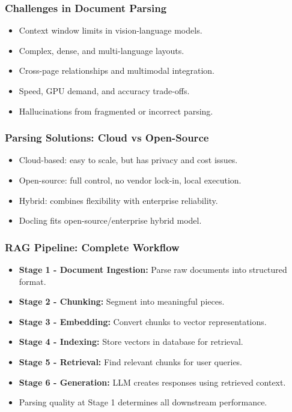 \begin{frame}[fragile]\frametitle{Challenges in Document Parsing}
      \begin{itemize}
        \item Context window limits in vision-language models.
        \item Complex, dense, and multi-language layouts.
        \item Cross-page relationships and multimodal integration.
        \item Speed, GPU demand, and accuracy trade-offs.
        \item Hallucinations from fragmented or incorrect parsing.
      \end{itemize}
\end{frame}

\begin{frame}[fragile]\frametitle{Parsing Solutions: Cloud vs Open-Source}
      \begin{itemize}
        \item Cloud-based: easy to scale, but has privacy and cost issues.
        \item Open-source: full control, no vendor lock-in, local execution.
        \item Hybrid: combines flexibility with enterprise reliability.
        \item Docling fits open-source/enterprise hybrid model.
      \end{itemize}
\end{frame}

\begin{frame}[fragile]\frametitle{RAG Pipeline: Complete Workflow}
      \begin{itemize}
        \item \textbf{Stage 1 - Document Ingestion:} Parse raw documents into structured format.
        \item \textbf{Stage 2 - Chunking:} Segment into meaningful pieces.
        \item \textbf{Stage 3 - Embedding:} Convert chunks to vector representations.
        \item \textbf{Stage 4 - Indexing:} Store vectors in database for retrieval.
        \item \textbf{Stage 5 - Retrieval:} Find relevant chunks for user queries.
        \item \textbf{Stage 6 - Generation:} LLM creates responses using retrieved context.
        \item Parsing quality at Stage 1 determines all downstream performance.
      \end{itemize}
\end{frame}

